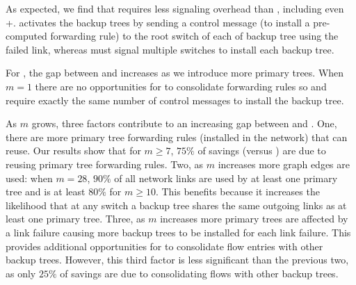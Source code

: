 As expected, we find that \pre requires less signaling overhead than \posts, including even \posts+\lbs.   \pre activates the backup trees by sending a control message
(to install a pre-computed forwarding rule) to the root switch of each of backup tree using the failed link, whereas \post must signal multiple switches to install each 
backup tree. %


For \posts, the gap between \base and \merge increases as we introduce more primary trees.  
When $m=1$ there are no opportunities for \merge to consolidate forwarding rules so \merge and \base require exactly 
the same number of control messages to install the backup tree.

As $m$ grows, three factors contribute to an increasing gap between \base and \merges.  One, there are more primary tree forwarding rules 
(installed in the network) that \merge can reuse. Our results show that for $m \geq 7$, $75\%$ of \merge savings (versus \bases) are due to reusing primary tree forwarding rules. Two, 
as $m$ increases more graph edges are used: when $m=28$, $90\%$ of all network links are used by at least one primary tree and is at least $80\%$ for $m \geq10$. 
This benefits \merge because it increases the likelihood that at any switch a backup tree shares the same outgoing links as at least one primary tree. 
Three, as $m$ increases more primary trees are affected by a link failure causing more backup trees to be installed for each link failure. 
This provides additional opportunities for \merge to consolidate flow entries with other backup trees.
However, this third factor is less significant than the previous two, as only $25\%$ of \merge savings are due to consolidating flows with other backup trees.

